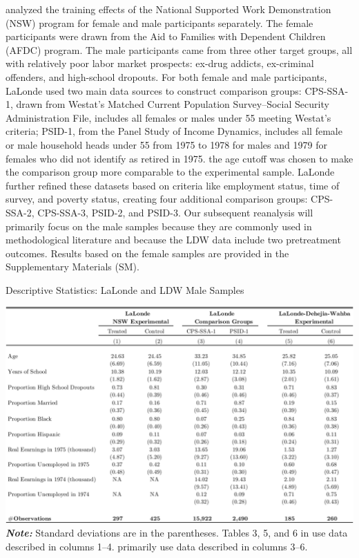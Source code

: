\documentclass[letterpaper,12pt,leqno]{article}
\begin{document}
\citet{LaLonde} analyzed the training effects of the National Supported Work Demonstration (NSW) program for female and male participants separately. The female participants were drawn from the Aid to Families with Dependent Children (AFDC) program. The male participants came from three other target groups, all with relatively poor labor market prospects: ex-drug addicts, ex-criminal offenders, and high-school dropouts. For both female and male participants, LaLonde used two main data sources to construct comparison groups: CPS-SSA-1, drawn from Westat's Matched Current Population Survey--Social Security Administration File, includes all females or males under 55 meeting Westat's criteria; PSID-1, from the Panel Study of Income Dynamics, includes all female or male household heads under 55 from 1975 to 1978 for males and 1979 for females who did not identify as retired in 1975. the age cutoff was chosen to make the comparison group more comparable to the experimental sample. LaLonde further refined these datasets based on criteria like employment status, time of survey, and poverty status, creating four additional comparison groups: CPS-SSA-2, CPS-SSA-3, PSID-2, and PSID-3. Our subsequent reanalysis will primarily focus on the male samples because they are commonly used in methodological literature and because the LDW data include two pretreatment outcomes. Results based on the female samples are provided in the Supplementary Materials (SM). 

\begin{table}[!ht]
\caption{Descriptive Statistics: LaLonde and LDW Male Samples}\label{tb:samples}
\begin{minipage}[c]{0.9\textwidth}
\vspace{-0.5em}\includegraphics[width=\linewidth]{stats.pdf}
{\footnotesize\textbf{\textit{Note:}} Standard deviations are in the parentheses. Tables 3, 5, and 6 in \citet{LaLonde} use data described in columns 1--4. \cite{dehejiawahba} primarily use data described in columns 3--6.}
\end{minipage}%
\end{table}
\end{document}
